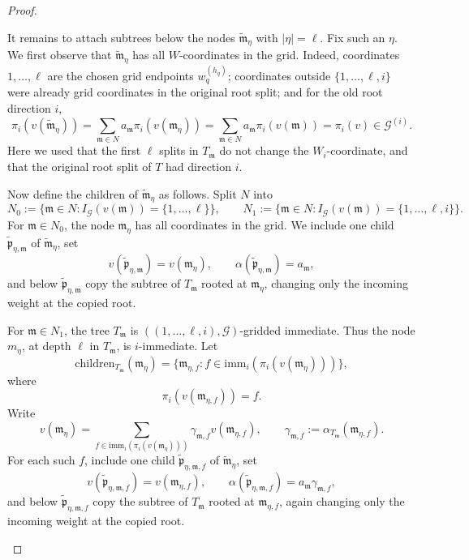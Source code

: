\documentclass[10pt]{amsart}
\theoremstyle{plain}
\theoremstyle{definition}
\providecommand{\cG}[0]{\ensuremath{\mathcal G}\xspace}
\providecommand{\imm}[0]{\ensuremath{\mathrm{imm}}\xspace}
\newcommand{\fp}{\mathfrak{p}}
\begin{document}
\begin{proof}
\begin{enumerate}[1.]
\begin{enumerate}
It remains to attach subtrees below the nodes \(\widetilde{\mathfrak{m}}_\eta\) with \(|\eta|=\ell\).  Fix such
an \(\eta\).  We first observe that \(\widetilde{\mathfrak{m}}_\eta\) has all \(W\)-coordinates in the grid.  Indeed,
coordinates \(1,\ldots,\ell\) are the chosen grid endpoints \(w_q^{(h_q)}\); coordinates
outside \(\{1,\ldots,\ell,i\}\) were already grid coordinates in the original root split; and
for the old root direction \(i\),
\[
        \pi_i(v(\widetilde{\mathfrak{m}}_\eta))
        =
        \sum_{\mathfrak{m}\in N}a_{\mathfrak{m}} \pi_i(v(\mathfrak{m}_\eta))
        =
        \sum_{\mathfrak{m}\in N}a_{\mathfrak{m}} \pi_i(v(\mathfrak{m}))
        =
        \pi_i(v)\in \cG^{(i)}.
\]
Here we used that the first \(\ell\) splits in \(T_\mathfrak{m}\) do not change the \(W_i\)-coordinate,
and that the original root split of \(T\) had direction \(i\).

Now define the children of \(\widetilde{\mathfrak{m}}_\eta\) as follows.  Split \(N\) into
\[
        N_0:=\{\mathfrak{m}\in N: I_{\mathcal G}(v(\mathfrak{m}))=\{1,\ldots,\ell\}\},
        \qquad
        N_1:=\{\mathfrak{m}\in N: I_{\mathcal G}(v(\mathfrak{m}))=\{1,\ldots,\ell,i\}\}.
\]
For \(\mathfrak{m}\in N_0\), the node \(\mathfrak{m}_\eta\) has all coordinates in the grid.  We include one
child 
\(\widetilde{\fp}_{\eta,\mathfrak{m}}\) of \(\widetilde{\mathfrak{m}}_\eta\), set
\[
        v(\widetilde{\fp}_{\eta,\mathfrak{m}})=v(\mathfrak{m}_\eta),
        \qquad
        \alpha(\widetilde{\fp}_{\eta,\mathfrak{m}})=a_{\mathfrak{m}},
\]
and below \(\widetilde{\fp}_{\eta,\mathfrak{m}}\) copy the subtree of \(T_{\mathfrak{m}}\) rooted at \(\mathfrak{m}_\eta\), changing only
the incoming weight at the copied root.

For \(\mathfrak{m}\in N_1\), the tree \(T_{\mathfrak{m}}\) is
\(((1,\ldots,\ell,i),\cG)\)-gridded immediate.  Thus the node \(m_\eta\), at depth
\(\ell\) in \(T_{\mathfrak{m}}\), is \(i\)-immediate.  Let
\[
        \mathrm{children}_{T_{\mathfrak{m}}}(\mathfrak{m}_\eta)=\{\mathfrak{m}_{\eta,f}: f\in \imm_i(\pi_i(v(\mathfrak{m}_\eta)))\},
\]
where
\[
        \pi_i(v(\mathfrak{m}_{\eta,f}))=f.
\]
Write
\[
        v(\mathfrak{m}_\eta)
        =
        \sum_{f\in \imm_i(\pi_i(v(\mathfrak{m}_\eta)))}
        \gamma_{\mathfrak{m},f}v(\mathfrak{m}_{\eta,f}),
        \qquad
        \gamma_{\mathfrak{m},f}:=\alpha_{T_\mathfrak{m}}(\mathfrak{m}_{\eta,f}).
\]
For each such \(f\), include one child \(\widetilde{\fp}_{\eta,\mathfrak{m},f}\) of \(\widetilde{\mathfrak{m}}_\eta\), set
\[
        v(\widetilde{\fp}_{\eta,\mathfrak{m},f})=v(\mathfrak{m}_{\eta,f}),
        \qquad
        \alpha(\widetilde{\fp}_{\eta,\mathfrak{m},f})=a_{\mathfrak{m}}\gamma_{\mathfrak{m},f},
\]
and below \(\widetilde{\fp}_{\eta,\mathfrak{m},f}\) copy the subtree of \(T_{\mathfrak{m}}\) rooted at \(\mathfrak{m}_{\eta,f}\), again
changing only the incoming weight at the copied root.


\end{enumerate}
\end{enumerate}
\end{proof}
\end{document}
